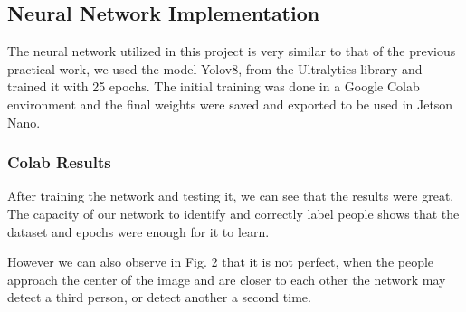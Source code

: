 \documentclass[conference]{IEEEtran}
\begin{document}
\subsection{Neural Network Implementation}

The neural network utilized in this project is very similar to that of the previous practical work, we used the model Yolov8, from the Ultralytics library and trained it with 25 epochs. The initial training was done in a Google Colab environment and the final weights were saved and exported to be used in Jetson Nano.

\subsubsection{Colab Results}

After training the network and testing it, we can see that the results were great. The capacity of our network to identify and correctly label people shows that the dataset and epochs were enough for it to learn. 

However we can also observe in Fig. 2 that it is not perfect, when the people approach the center of the image and are closer to each other the network may detect a third person, or detect another a second time.
\end{document}
